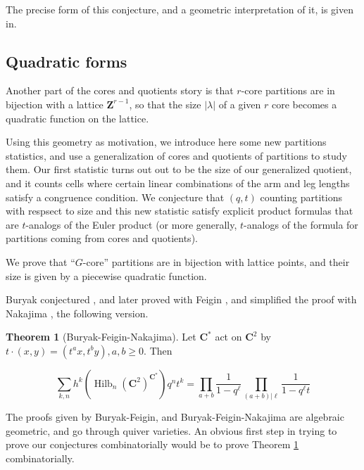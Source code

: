 \documentclass{amsart}[12pt]
\theoremstyle{definition}
\newtheorem{theorem}[dummy]{Theorem}
\newcommand{\Z}{\mathbf{Z}}
\newcommand{\C}{\mathbf{C}}
\DeclareMathOperator{\Hilb}{Hilb}
\begin{document}
The precise form of this conjecture, and a geometric interpretation of it, is given in.  

\subsection{Quadratic forms}
Another part of the cores and quotients story is that $r$-core partitions are in bijection with a lattice $\Z^{r-1}$, so that the size $|\lambda|$ of a given $r$ core becomes a quadratic function on the lattice.




Using this geometry as motivation, we introduce here some new partitions statistics, and use a generalization of cores and quotients of partitions to study them.  Our first statistic turns out out to be the size of our generalized quotient, and it counts cells where certain linear combinations of the arm and leg lengths satisfy a congruence condition.  We conjecture that $(q,t)$ counting partitions with respsect to size and this new statistic satisfy explicit product formulas that are $t$-analogs of the Euler product (or more generally, $t$-analogs of the formula for partitions coming from cores and quotients).  



We prove that ``$G$-core'' partitions are in bijection with lattice points, and their size is given by a piecewise quadratic function.  




Buryak conjectured \cite{Buryak}, and later proved with Feigin \cite{BF}, and simplified the proof with Nakajima \cite{BFN}, the following version. 

\begin{theorem}[Buryak-Feigin-Nakajima] \label{thm:BFN}
Let $\C^*$ act on $\C^2$ by $t\cdot (x,y)=(t^ax, t^by), a,b\geq 0$.  Then

$$\sum_{k,n} h^k(\Hilb_n(\C^2)^{\C^*})q^nt^k=\prod_{a+b } \frac{1}{1-q^\ell}\prod_{(a+b)|\ell} \frac{1}{1-q^\ell t}$$
\end{theorem}

The proofs given by Buryak-Feigin, and Buryak-Feigin-Nakajima are algebraic geometric, and go through quiver varieties.  An obvious first step in trying to prove our conjectures combinatorially would be to prove Theorem \ref{thm:BFN} combinatorially.  
\end{document}
